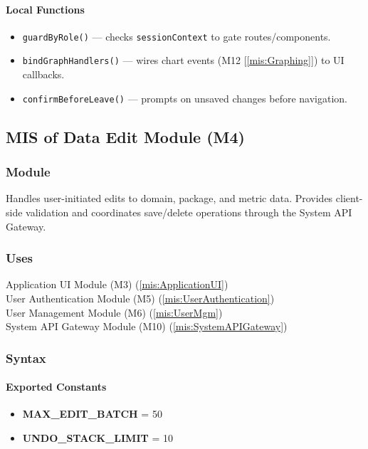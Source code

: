 \documentclass[12pt, titlepage]{article}
\begin{document}
  \paragraph{Local Functions}
  \begin{itemize}
    \item \texttt{guardByRole()} — checks \texttt{sessionContext} to gate routes/components.
    \item \texttt{bindGraphHandlers()} — wires chart events (M12 [\ref{mis:Graphing}]) to UI callbacks.
    \item \texttt{confirmBeforeLeave()} — prompts on unsaved changes before navigation.
  \end{itemize}


\subsection{MIS of Data Edit Module (M4)}
  \label{mis:DataEdit}

  \subsubsection{Module}
  Handles user-initiated edits to domain, package, and metric data. Provides client-side validation and coordinates save/delete operations through the System API Gateway.

  \subsubsection{Uses}
  Application UI Module (M3) (\ref{mis:ApplicationUI})\\
  User Authentication Module (M5) (\ref{mis:UserAuthentication})\\
  User Management Module (M6) (\ref{mis:UserMgm})\\
  System API Gateway Module (M10) (\ref{mis:SystemAPIGateway})\\

  \subsubsection{Syntax}

  \paragraph{Exported Constants}
  \begin{itemize}
    \item \textbf{MAX\_EDIT\_BATCH} = 50
    \item \textbf{UNDO\_STACK\_LIMIT} = 10
  \end{itemize}
\end{document}

